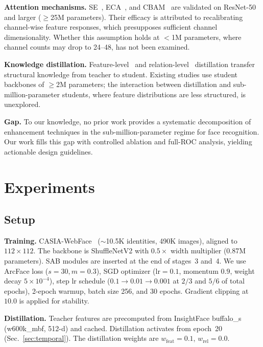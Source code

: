 \documentclass[journal,10pt]{IEEEtran}
\begin{document}
\textbf{Attention mechanisms.} SE~\cite{se}, ECA~\cite{eca}, and CBAM~\cite{cbam} are validated on ResNet-50 and larger ($\geq$25M parameters). Their efficacy is attributed to recalibrating channel-wise feature responses, which presupposes sufficient channel dimensionality. Whether this assumption holds at $<$1M parameters, where channel counts may drop to 24--48, has not been examined.

\textbf{Knowledge distillation.} Feature-level~\cite{kd} and relation-level~\cite{rkd} distillation transfer structural knowledge from teacher to student. Existing studies use student backbones of $\geq$2M parameters; the interaction between distillation and sub-million-parameter students, where feature distributions are less structured, is unexplored.

\textbf{Gap.} To our knowledge, no prior work provides a systematic decomposition of enhancement techniques in the sub-million-parameter regime for face recognition. Our work fills this gap with controlled ablation and full-ROC analysis, yielding actionable design guidelines.



\section{Experiments}
\label{sec:exp}

\subsection{Setup}
\label{sec:setup}

\textbf{Training.} CASIA-WebFace~\cite{casia} ($\sim$10.5K identities, 490K images), aligned to $112{\times}112$. The backbone is ShuffleNetV2 with $0.5{\times}$ width multiplier (0.87M parameters). SAB modules are inserted at the end of stages~3 and~4. We use ArcFace loss ($s{=}30, m{=}0.3$), SGD optimizer ($\text{lr}{=}0.1$, momentum $0.9$, weight decay $5{\times}10^{-4}$), step lr schedule ($0.1{\to}0.01{\to}0.001$ at $2/3$ and $5/6$ of total epochs), 2-epoch warmup, batch size 256, and 30 epochs. Gradient clipping at $10.0$ is applied for stability.

\textbf{Distillation.} Teacher features are precomputed from InsightFace buffalo\_s (w600k\_mbf, 512-d) and cached. Distillation activates from epoch~20 (Sec.~\ref{sec:temporal}). The distillation weights are $w_{\mathrm{feat}}{=}0.1$, $w_{\mathrm{rel}}{=}0.0$.
\end{document}
